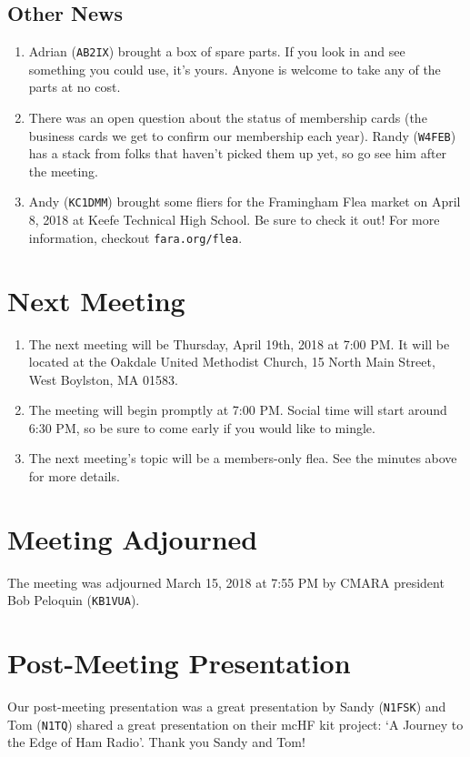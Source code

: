 \documentclass[10pt,letterpaper]{article}
\begin{document}
\subsection{Other News}
\begin{enumerate}
  \item Adrian (\texttt{AB2IX}) brought a box of spare parts. If you look in and see something you could use, it's yours. Anyone is welcome to take any of the parts at no cost.
  \item There was an open question about the status of membership cards (the business cards we get to confirm our membership each year). Randy (\texttt{W4FEB}) has a stack from folks that haven't picked them up yet, so go see him after the meeting.
  \item Andy (\texttt{KC1DMM}) brought some fliers for the Framingham Flea market on April 8, 2018 at Keefe Technical High School. Be sure to check it out! For more information, checkout \texttt{fara.org/flea}.
\end{enumerate}

\section{Next Meeting}
\begin{enumerate}
  \item The next meeting will be Thursday, April 19th, 2018 at 7:00 PM. It will be located at the Oakdale United Methodist Church, 15 North Main Street, West Boylston, MA 01583.
  \item The meeting will begin promptly at 7:00 PM. Social time will start around 6:30 PM, so be sure to come early if you would like to mingle.
  \item The next meeting's topic will be a members-only flea. See the minutes above for more details.
\end{enumerate}

\section{Meeting Adjourned}
The meeting was adjourned March 15, 2018 at 7:55 PM by CMARA president Bob Peloquin (\texttt{KB1VUA}).

\section{Post-Meeting Presentation}
Our post-meeting presentation was a great presentation by Sandy (\texttt{N1FSK}) and Tom (\texttt{N1TQ}) shared a great presentation on their mcHF kit project: `A Journey to the Edge of Ham Radio'. Thank you Sandy and Tom!
\end{document}

